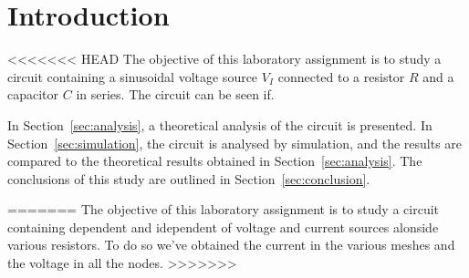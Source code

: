 \newpage
\section{Introduction}
\label{sec:introduction}
<<<<<<< HEAD
The objective of this laboratory assignment is to study a circuit containing a
sinusoidal voltage source $V_I$ connected to a resistor $R$ and a capacitor $C$
in series. The circuit can be seen if.


In Section~\ref{sec:analysis}, a theoretical analysis of the circuit is
presented. In Section~\ref{sec:simulation}, the circuit is analysed by
simulation, and the results are compared to the theoretical results obtained in
Section~\ref{sec:analysis}. The conclusions of this study are outlined in
Section~\ref{sec:conclusion}.



=======
The objective of this laboratory assignment is to study a circuit containing dependent and idependent of voltage and current sources alonside various resistors. To do so we've obtained the current in the various meshes and the voltage in all the nodes. 
>>>>>>> 
